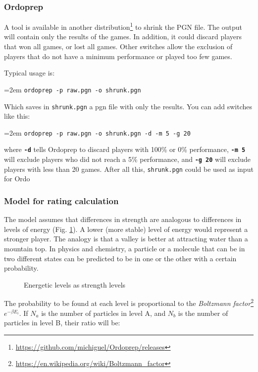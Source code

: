 \documentclass[12pt]{article}
\newcommand{\swtch} [1] {\texttt{\textbf{#1}}}
\newcommand{\filename} [1] {\texttt{#1}}
\newcommand{\cmdln}[1]{
	\par
	\begingroup
		\leftskip=2em
		\addtolength{\rightskip}{0em}
		\noindent \small{\texttt{#1}}
		\par
	\endgroup
}
\begin{document}
\subsubsection*{Ordoprep}
A tool is available in another distribution\footnote{\url{https://github.com/michiguel/Ordoprep/releases}} to shrink the PGN file.
The output will contain only the results of the games. 
In addition, it could discard players that won all games, or lost all games. 
Other switches allow the exclusion of players that do not have a minimum performance or played too few games.

Typical usage is:

\cmdln{ordoprep -p raw.pgn -o shrunk.pgn}

Which saves in \filename{shrunk.pgn} a pgn file with only the results. 
You can add switches like this:

\cmdln{ordoprep -p raw.pgn -o shrunk.pgn -d -m 5 -g 20}

where \swtch{-d} tells Ordoprep to discard players with 100\% or 0\% performance, \swtch{-m~5}
will exclude players who did not reach a 5\% performance, and \swtch{-g~20} will exclude players with less than 20 games.
After all this, \filename{shrunk.pgn} could be used as input for Ordo

\subsubsection*{Model for rating calculation}

The model assumes that differences in strength are analogous to differences in levels of energy (Fig. \ref{fig:figlevels1}). 
A lower (more stable) level of energy would represent a stronger player.
The analogy is that a valley is better at attracting water than a mountain top. 
In physics and chemistry, a particle or a molecule that can be in two different states can be predicted to be in one or the other with a certain probability.

	\begin{figure}[htb]
	\caption{\label{fig:figlevels1} Energetic levels as strength levels}
	\end{figure}

The probability to be found at each level is proportional to the 
\textit{Boltzmann factor}\footnote{\url{https://en.wikipedia.org/wiki/Boltzmann_factor}} $e^{-\beta E_{i}}$.
If $N_{a}$ is the number of particles in level A, and $N_{b}$ is the number of particles in level B, their ratio will be:
\end{document}
